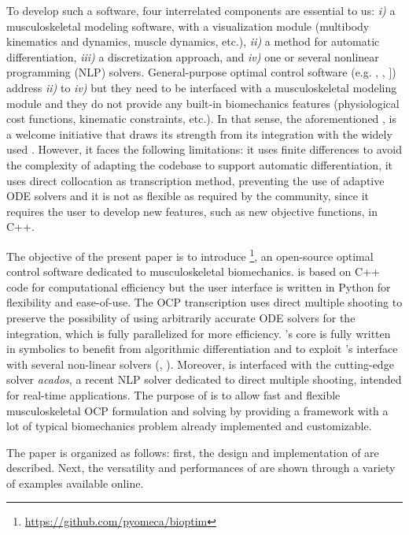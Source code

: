 To develop such a software, four interrelated components are essential to us: \textit{i)} a musculoskeletal modeling software, with a visualization module (multibody kinematics and dynamics, muscle dynamics, etc.), \textit{ii)} a method for automatic differentiation, \textit{iii)} a discretization approach, and \textit{iv)} one or several nonlinear programming (NLP) solvers. 
General-purpose optimal control software (e.g. \gpopsii \cite{patterson2014gpops}, \muscodii \cite{leineweber2003efficient1,leineweber2003efficient2}, \acado \cite{houska2011acado}]) address \textit{ii)} to \textit{iv)} but they need to be interfaced with a musculoskeletal modeling module and they do not provide any built-in biomechanics features (physiological cost functions, kinematic constraints, etc.). 
In that sense, the aforementioned \moco, is a welcome initiative that draws its strength from its integration with the widely used \opensim.
However, it faces the following limitations: it uses finite differences to avoid the complexity of adapting the \opensim codebase to support automatic differentiation, it uses direct collocation as transcription method, preventing the use of adaptive ODE solvers and it is not as flexible as required by the community, since it requires the user to develop new features, such as new objective functions, in C++. 

The objective of the present paper is to introduce \bioptim\footnote{
\href{https://github.com/pyomeca/bioptim}{https://github.com/pyomeca/bioptim}}, an open-source optimal control software dedicated to musculoskeletal biomechanics.
\bioptim is based on C++ code for computational efficiency but the user interface is written in Python for flexibility and ease-of-use. 
The OCP transcription uses direct multiple shooting to preserve the possibility of using arbitrarily accurate ODE solvers for the integration, which is fully parallelized for more efficiency.
\bioptim's core is fully written in \casadi symbolics to benefit from algorithmic differentiation and to exploit \casadi 's interface with several non-linear solvers (\ipopt, \snopt).
Moreover, \bioptim is interfaced with the cutting-edge solver \textit{acados}, a recent NLP solver dedicated to direct multiple shooting, intended for real-time applications.
The purpose of \bioptim is to allow fast and flexible musculoskeletal OCP formulation and solving by providing a framework with a lot of typical biomechanics problem already implemented and customizable.

The paper is organized as follows: first, the design and implementation of \bioptim are described.
Next, the versatility and performances of \bioptim are shown through a variety of examples available online. 
